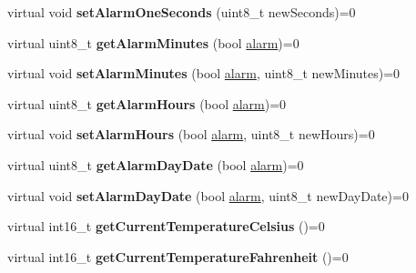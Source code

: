 \begin{DoxyCompactItemize}
\item 
\mbox{\label{classreal_time_clock_a448cbe8ab7f6649ee32eeb415721707f}} 
virtual void {\bfseries set\+Alarm\+One\+Seconds} (uint8\+\_\+t new\+Seconds)=0
\item 
\mbox{\label{classreal_time_clock_a0b3babca96f8246d4bb5e3ac2a95801d}} 
virtual uint8\+\_\+t {\bfseries get\+Alarm\+Minutes} (bool \mbox{\hyperlink{classalarm}{alarm}})=0
\item 
\mbox{\label{classreal_time_clock_a53ffba88cd87d05af58288fb4fc589b5}} 
virtual void {\bfseries set\+Alarm\+Minutes} (bool \mbox{\hyperlink{classalarm}{alarm}}, uint8\+\_\+t new\+Minutes)=0
\item 
\mbox{\label{classreal_time_clock_abca1ab557b357e3046d7d97eec89f750}} 
virtual uint8\+\_\+t {\bfseries get\+Alarm\+Hours} (bool \mbox{\hyperlink{classalarm}{alarm}})=0
\item 
\mbox{\label{classreal_time_clock_a9f0cd64ce9a783f149fcbb9f7eb36524}} 
virtual void {\bfseries set\+Alarm\+Hours} (bool \mbox{\hyperlink{classalarm}{alarm}}, uint8\+\_\+t new\+Hours)=0
\item 
\mbox{\label{classreal_time_clock_afe0a54cb2f803d01df03e2ea8e86bbf9}} 
virtual uint8\+\_\+t {\bfseries get\+Alarm\+Day\+Date} (bool \mbox{\hyperlink{classalarm}{alarm}})=0
\item 
\mbox{\label{classreal_time_clock_a2c2bb16a7fc59f463fb3aaed2fcd1926}} 
virtual void {\bfseries set\+Alarm\+Day\+Date} (bool \mbox{\hyperlink{classalarm}{alarm}}, uint8\+\_\+t new\+Day\+Date)=0
\item 
\mbox{\label{classreal_time_clock_ac662348fcf7b5fb51fdcf79f83958a33}} 
virtual int16\+\_\+t {\bfseries get\+Current\+Temperature\+Celsius} ()=0
\item 
\mbox{\label{classreal_time_clock_a8fe956100fc4e339cd68ab413465f666}} 
virtual int16\+\_\+t {\bfseries get\+Current\+Temperature\+Fahrenheit} ()=0
\item 

\end{DoxyCompactItemize}
